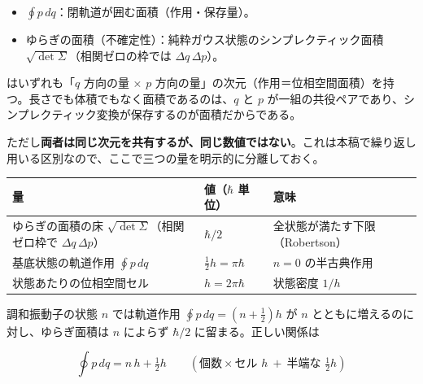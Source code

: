 \documentclass[
]{ltjsarticle}
\newcounter{none} %
\providecommand{\tightlist}{%
  \setlength{\itemsep}{0pt}\setlength{\parskip}{0pt}}
\begin{document}
\begin{itemize}
\tightlist
\item
  \(\oint p\,dq\)：閉軌道が囲む面積（作用・保存量）。
\item
  ゆらぎの面積（不確定性）：純粋ガウス状態のシンプレクティック面積
  \(\sqrt{\det\Sigma}\)（相関ゼロの枠では \(\Delta q\,\Delta p\)）。
\end{itemize}

はいずれも「\(q\) 方向の量 × \(p\)
方向の量」の次元（作用＝位相空間面積）を持つ。長さでも体積でもなく面積であるのは、\(q\)
と \(p\)
が一組の共役ペアであり、シンプレクティック変換が保存するのが面積だからである。

ただし\textbf{両者は同じ次元を共有するが、同じ数値ではない}。これは本稿で繰り返し用いる区別なので、ここで三つの量を明示的に分離しておく。

{\def\LTcaptype{none} %
\begin{longtable}[]{@{}
  >{\raggedright\arraybackslash}p{}
  >{\raggedright\arraybackslash}p{}
  >{\raggedright\arraybackslash}p{}@{}}
\toprule\noalign{}
\begin{minipage}[b]{\linewidth}\raggedright
量
\end{minipage} & \begin{minipage}[b]{\linewidth}\raggedright
値（\(\hbar\) 単位）
\end{minipage} & \begin{minipage}[b]{\linewidth}\raggedright
意味
\end{minipage} \\
\midrule\noalign{}
\endhead
\bottomrule\noalign{}
\endlastfoot
ゆらぎの面積の床 \(\sqrt{\det\Sigma}\)（相関ゼロ枠で
\(\Delta q\,\Delta p\)） & \(\hbar/2\) &
全状態が満たす下限（Robertson） \\
基底状態の軌道作用 \(\oint p\,dq\) & \(\tfrac12 h=\pi\hbar\) & \(n=0\)
の半古典作用 \\
状態あたりの位相空間セル & \(h=2\pi\hbar\) & 状態密度 \(1/h\) \\
\end{longtable}
}

調和振動子の状態 \(n\) では軌道作用 \(\oint p\,dq=(n+\tfrac12)h\) が
\(n\) とともに増えるのに対し、ゆらぎ面積は \(n\) によらず \(\hbar/2\)
に留まる。正しい関係は

\[\oint p\,dq = n\,h + \tfrac12 h\qquad(\text{個数}\times\text{セル }h\ +\ \text{半端な }\tfrac12 h)\]
\end{document}
